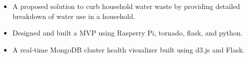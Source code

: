 \documentclass[10pt,a4paper,academicons]{altacv}
\begin{document}

\begin{itemize}
\item A proposed solution to curb household water waste by providing detailed breakdown of water use in a household.
\item Designed and built a MVP using Rasperry Pi, tornado, flask, and python.
\end{itemize}
\divider

\begin{itemize}
\item A real-time MongoDB cluster health visualizer built using d3.js and Flask.
\end{itemize}
\end{document}
